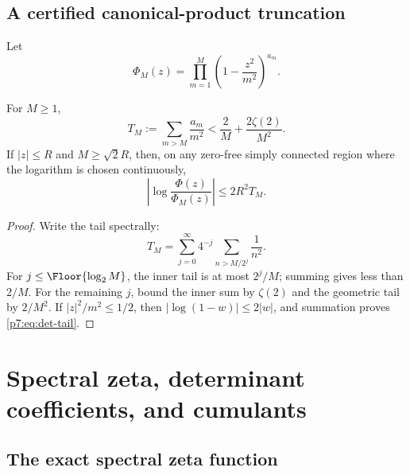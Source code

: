 \documentclass[11pt]{article}
\numberwithin{equation}{section}
\theoremstyle{definition}
\theoremstyle{remark}
\begin{document}
\subsection{A certified canonical-product truncation}

Let
\[
 \Phi_M(z)=\prod_{m=1}^{M}\left(1-\frac{z^2}{m^2}\right)^{a_m}.
\]

\begin{proposition}\label{p7:prop:tail}
For $M\ge1$,
\begin{equation}\label{p7:eq:trace-tail}
 T_M:=\sum_{m>M}\frac{a_m}{m^2}
 <\frac2M+\frac{2\zeta(2)}{M^2}.
\end{equation}
If $|z|\le R$ and $M\ge\sqrt2R$, then, on any zero-free simply connected region where the logarithm is chosen continuously,
\begin{equation}\label{p7:eq:det-tail}
 \left|\log\frac{\Phi(z)}{\Phi_M(z)}\right|
 \le2R^2T_M.
\end{equation}
\end{proposition}

\begin{proof}
Write the tail spectrally:
\[
 T_M=\sum_{j=0}^{\infty}4^{-j}
 \sum_{n>M/2^j}\frac1{n^2}.
\]
For $j\le\Floor{\log_2M}$, the inner tail is at most $2^j/M$; summing gives less than $2/M$.  For the remaining $j$, bound the inner sum by $\zeta(2)$ and the geometric tail by $2/M^2$.  If $|z|^2/m^2\le1/2$, then $|\log(1-w)|\le2|w|$, and summation proves \cref{p7:eq:det-tail}.
\end{proof}

\section{Spectral zeta, determinant coefficients, and cumulants}

\subsection{The exact spectral zeta function}
\end{document}
